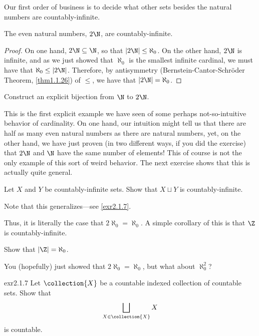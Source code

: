 Our first order of business is to decide what other sets besides the natural numbers are countably-infinite.
\begin{prp}{}{}
The even natural numbers, $2\N$, are countably-infinite.
\begin{proof}
On one hand, $2\N \subseteq \N$, so that $|2\N |\leq \aleph _0$.  On the other hand, $2\N$ is infinite, and as we just showed that $\aleph _0$ is the smallest infinite cardinal, we must have that $\aleph _0\leq |2\N |$.  Therefore, by antisymmetry (Bernstein-Cantor-Schr\"{o}der Theorem, \cref{thm1.1.26}) of $\leq$, we have that $|2\N |=\aleph _0$.
\end{proof}
\end{prp}
\begin{exr}{}{}
Construct an explicit bijection from $\N$ to $2\N$.
\end{exr}
This is the first explicit example we have seen of some perhaps not-so-intuitive behavior of cardinality.  On one hand, our intuition might tell us that there are half as many even natural numbers as there are natural numbers, yet, on the other hand, we have just proven (in two different ways, if you did the exercise) that $2\N$ and $\N$ have the same number of elements!  This of course is not the only example of this sort of weird behavior.  The next exercise shows that this is actually quite general.
\begin{exr}{}{}
Let $X$ and $Y$ be countably-infinite sets.  Show that $X\sqcup Y$ is countably-infinite.
\begin{rmk}
Note that this generalizes---see \cref{exr2.1.7}.
\end{rmk}
\end{exr}
Thus, it is literally the case that $2\aleph _0=\aleph _0$.  A simple corollary of this is that $\Z$ is countably-infinite.
\begin{exr}{}{}
Show that $|\Z |=\aleph _0$.
\end{exr}

You (hopefully) just showed that $2\aleph _0=\aleph _0$, but what about $\aleph _0^2$?
\begin{exr}{}{exr2.1.7}
Let $\collection{X}$ be a countable indexed collection of countable sets.  Show that
\begin{equation}
\bigsqcup _{X\in \collection{X}}X
\end{equation}
is countable.
\end{exr}


